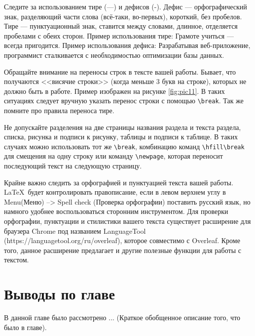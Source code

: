 \documentclass{report}
\begin{document}
Следите за использованием тире (---) и дефисов (-). Дефис — орфографический знак, разделяющий части слова (всё-таки, во-первых), короткий, без пробелов.
Тире — пунктуационный знак, ставится между словами, длинное, отделяется пробелами с обеих сторон. Пример использования тире: Грамоте учиться — всегда пригодится. Пример использования дефиса: Разрабатывая веб-приложение, программист сталкивается с необходимостью оптимизации базы данных.

Обращайте внимание на переносы строк в тексте вашей работы. Бывает, что получаются <<висячие строки>> (когда меньше 3 букв на строке), которых не должно быть в работе. Пример изображен на рисунке \ref{fig:pic11}. В таких ситуациях следует вручную указать перенос строки с помощью \verb|\break|. Так же помните про правила переноса тире.



Не допускайте разделения на две страницы названия раздела и текста раздела, списка, рисунка и подписи к рисунку, таблицы и подписи к таблице. В таких случаях можно использовать тот же \verb|\break|, комбинацию команд \verb|\hfill\break| для смещения на одну строку или команду \verb|\newpage|, которая переносит последующий текст на следующую страницу.


Крайне важно следить за орфографией и пунктуацией текста вашей работы. \LaTeX\ будет контролировать правописание, если в левом верхнем углу в Menu(Меню) --> Spell check (Проверка орфографии) поставить русский язык, но намного удобнее воспользоваться сторонним инструментом. Для проверки орфографии, пунктуации и стилистики вашего текста существует расширение для браузера Chrome под названием LanguageTool (https://languagetool.org/ru/overleaf), которое совместимо с Overleaf. Кроме того, данное расширение предлагает и другие полезные функции для работы с текстом.

\section*{Выводы по главе}
В данной главе было рассмотрено ... (Краткое обобщенное описание того, что было в главе).
\end{document}
